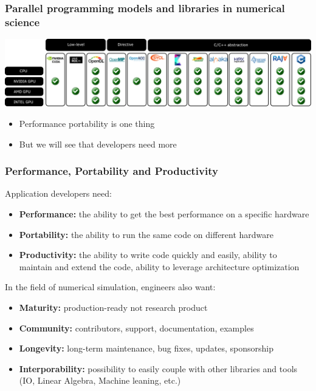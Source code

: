 \documentclass[aspectratio=169]{beamer}
\begin{document}
\begin{frame}
    \frametitle{Parallel programming models and libraries in numerical science}

    \begin{center}
        \includegraphics[width=\textwidth]{../../images/prog_model.png}
    \end{center}

    \begin{itemize}
        \item Performance portability is one thing
        \item But we will see that developers need more
    \end{itemize}

\end{frame}


\begin{frame}
    \frametitle{Performance, Portability and Productivity}

Application developers need:

\begin{itemize}
    \item \textbf{Performance:} the ability to get the best performance on a specific hardware
    \item \textbf{Portability:} the ability to run the same code on different hardware
    \item \textbf{Productivity:} the ability to write code quickly and easily, ability to maintain and extend the code, ability to leverage architecture optimization
\end{itemize}

In the field of numerical simulation, engineers also want:

\begin{itemize}
    \item \textbf{Maturity:} production-ready not research product
    \item \textbf{Community:} contributors, support, documentation, examples
    \item \textbf{Longevity:} long-term maintenance, bug fixes, updates, sponsorship
    \item \textbf{Interporability:} possibility to easily couple with other libraries and tools (IO, Linear Algebra, Machine leaning, etc.)
\end{itemize}

\end{frame}
\end{document}

